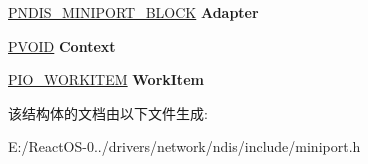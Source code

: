 \begin{DoxyCompactItemize}
\hyperlink{struct___n_d_i_s___m_i_n_i_p_o_r_t___b_l_o_c_k}{P\+N\+D\+I\+S\+\_\+\+M\+I\+N\+I\+P\+O\+R\+T\+\_\+\+B\+L\+O\+CK} {\bfseries Adapter}
\item 
\mbox{\label{struct___m_i_n_i_p_o_r_t___s_h_a_r_e_d___m_e_m_o_r_y_a60ab2e51e529a8b0133ce235ab947808}} 
\hyperlink{interfacevoid}{P\+V\+O\+ID} {\bfseries Context}
\item 
\mbox{\label{struct___m_i_n_i_p_o_r_t___s_h_a_r_e_d___m_e_m_o_r_y_a0f96440ad0f1706f8b33ae4c442abe22}} 
\hyperlink{struct___i_o___w_o_r_k_i_t_e_m}{P\+I\+O\+\_\+\+W\+O\+R\+K\+I\+T\+EM} {\bfseries Work\+Item}
\end{DoxyCompactItemize}


该结构体的文档由以下文件生成\+:\begin{DoxyCompactItemize}
\item 
E\+:/\+React\+O\+S-\/0../drivers/network/ndis/include/miniport.\+h\end{DoxyCompactItemize}
